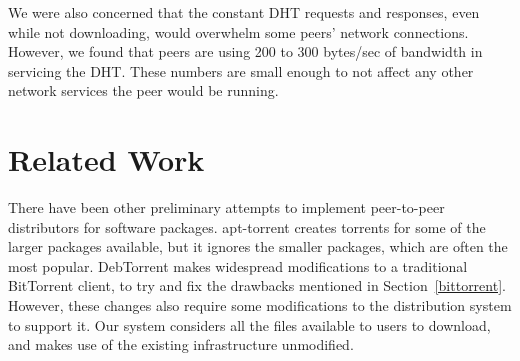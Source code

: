 \documentclass[conference]{IEEEtran}
\begin{document}
We were also concerned that the constant DHT requests and responses,
even while not downloading, would overwhelm some peers' network
connections. However, we found that peers are using 200 to 300 bytes/sec
of bandwidth in servicing the DHT. These numbers are
small enough to not affect any other network services the peer would
be running.



\section{Related Work}
\label{related}

There have been other preliminary attempts to implement peer-to-peer distributors for
software packages. apt-torrent \cite{apttorrent} creates torrents
for some of the larger packages available, but it ignores the
smaller packages, which are often the most popular. DebTorrent
\cite{debtorrent} makes widespread modifications to a traditional
BitTorrent client, to try and fix the drawbacks mentioned in
Section~\ref{bittorrent}. However, these changes also require some
modifications to the distribution system to support it. Our system
considers all the files available to users to download, and makes
use of the existing infrastructure unmodified.


\end{document}
